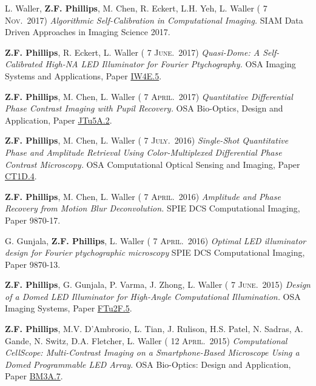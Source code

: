 \documentclass[12pt,letterpaper]{article}
\renewcommand{\date}[1]{{} #1}
\begin{document}
L. Waller, \textbf{Z.F. Phillips}, M. Chen, R. Eckert, L.H. Yeh, L. Waller (\date{7 \textsc{Nov.}~2017})
\emph{Algorithmic  \linebreak Self-Calibration in Computational Imaging.} SIAM Data Driven Approaches in Imaging Science 2017.

\textbf{Z.F. Phillips}, R. Eckert, L. Waller (\date{7 \textsc{June.}~2017})
\emph{Quasi-Dome: A Self-Calibrated High-NA LED  \linebreak Illuminator for Fourier Ptychography.} OSA Imaging Systems and Applications, Paper \href{https://www.osapublishing.org/abstract.cfm?uri=COSI-2016-CT1D.4}{IW4E.5}.
\medskip

\textbf{Z.F. Phillips}, M. Chen, L. Waller (\date{7 \textsc{April.}~2017})
\emph{Quantitative Differential Phase Contrast Imaging with Pupil Recovery.} OSA Bio-Optics, Design and Application, Paper \href{https://www.osapublishing.org/abstract.cfm?uri=BODA-2017-JTu5A.2}{JTu5A.2}.
\medskip

\textbf{Z.F. Phillips}, M. Chen, L. Waller (\date{7 \textsc{July.}~2016})
\emph{Single-Shot Quantitative Phase and Amplitude Retrieval Using Color-Multiplexed Differential Phase Contrast Microscopy.} OSA Computational Optical Sensing and Imaging, Paper \href{https://www.osapublishing.org/abstract.cfm?uri=COSI-2016-CT1D.4}{CT1D.4}.
\medskip

\textbf{Z.F. Phillips}, M. Chen, L. Waller (\date{7 \textsc{April.}~2016})
\emph{Amplitude and Phase Recovery from Motion Blur  \linebreak Deconvolution.} SPIE DCS Computational Imaging, Paper 9870-17.
\medskip

G. Gunjala, \textbf{Z.F. Phillips}, L. Waller (\date{7 \textsc{April.}~2016})
\emph{Optimal LED illuminator design for Fourier  \linebreak ptychographic microscopy} SPIE DCS Computational Imaging, Paper 9870-13.
\medskip

\textbf{Z.F. Phillips}, G. Gunjala, P. Varma, J. Zhong, L. Waller (\date{7 \textsc{June.}~2015})
\emph{Design of a Domed LED  \linebreak Illuminator for High-Angle Computational Illumination.} OSA Imaging Systems, Paper \href{https://www.osapublishing.org/abstract.cfm?uri=ISA-2015-ITh1A.2}{FTu2F.5}.
\medskip

\textbf{Z.F. Phillips}, M.V. D'Ambrosio, L. Tian, J. Rulison, H.S. Patel, N. Sadras, A. Gande, N. Switz,  \linebreak D.A. Fletcher, L. Waller (\date{12 \textsc{April.}~2015})
\emph{Computational CellScope: Multi-Contrast Imaging on a  \linebreak Smartphone-Based Microscope Using a Domed Programmable LED Array}. OSA Bio-Optics:  \linebreak Design and Application, Paper \href{https://www.osapublishing.org/abstract.cfm?uri=BODA-2015-BM3A.7}{BM3A.7}.
\medskip
\end{document}
